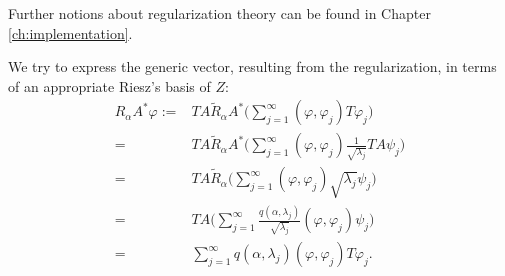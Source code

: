 \documentclass[10pt, a4paper, twoside, openright]{book}
\theoremstyle{definition}
\theoremstyle{plain}
\theoremstyle{plain}
\theoremstyle{plain}
\theoremstyle{plain}
\theoremstyle{plain}
\theoremstyle{plain}
\theoremstyle{plain}
\theoremstyle{plain}
\let\phi\varphi
\begin{document}
Further notions about regularization theory can be found in Chapter \ref{ch:implementation}.
\begin{center}
\end{center}
We try to express the generic vector, resulting from the regularization, in terms of an appropriate Riesz's basis of $Z$:
\begin{align}
  R_\alpha A^*\phi :=& TA\tilde{R}_\alpha A^*\Big(\sum_{j=1}^\infty(\phi,\phi_j)T\phi_j\Big) \\
  =& TA\tilde{R}_\alpha A^*\Big(\sum_{j=1}^\infty(\phi,\phi_j)\frac{1}{\sqrt{\lambda_j}}TA\psi_j\Big) \\
  =& TA\tilde{R}_\alpha \Big(\sum_{j=1}^\infty(\phi,\phi_j)\sqrt{\lambda_j}\psi_j\Big) \\
  =& TA\Big(\sum_{j=1}^\infty\frac{q(\alpha,\lambda_j)}{\sqrt{\lambda_j}}(\phi,\phi_j)\psi_j\Big) \\
  =&\sum_{j=1}^\infty q(\alpha,\lambda_j)(\phi,\phi_j)T\phi_j.
\end{align}
\end{document}

